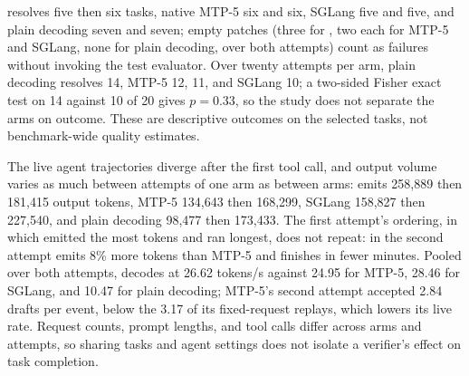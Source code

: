 \sys{} resolves five then six tasks, native MTP-5 six and six, SGLang five and five, and plain decoding seven and seven; empty patches (three for \sys{}, two each for MTP-5 and SGLang, none for plain decoding, over both attempts) count as failures without invoking the test evaluator. Over twenty attempts per arm, plain decoding resolves 14, MTP-5 12, \sys{} 11, and SGLang 10; a two-sided Fisher exact test on 14 against 10 of 20 gives $p=0.33$, so the study does not separate the arms on outcome. These are descriptive outcomes on the selected tasks, not benchmark-wide quality estimates.

The live agent trajectories diverge after the first tool call, and output volume varies as much between attempts of one arm as between arms: \sys{} emits 258,889 then 181,415 output tokens, MTP-5 134,643 then 168,299, SGLang 158,827 then 227,540, and plain decoding 98,477 then 173,433. The first attempt's ordering, in which \sys{} emitted the most tokens and ran longest, does not repeat: in the second attempt \sys{} emits 8\% more tokens than MTP-5 and finishes in fewer minutes. Pooled over both attempts, \sys{} decodes at 26.62 tokens/s against 24.95 for MTP-5, 28.46 for SGLang, and 10.47 for plain decoding; MTP-5's second attempt accepted 2.84 drafts per event, below the 3.17 of its fixed-request replays, which lowers its live rate. Request counts, prompt lengths, and tool calls differ across arms and attempts, so sharing tasks and agent settings does not isolate a verifier's effect on task completion.
